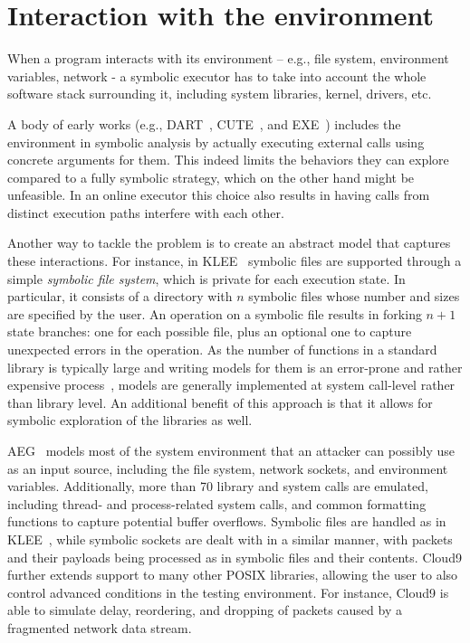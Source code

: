 
\section{Interaction with the environment}

When a program interacts with its environment -- e.g., file system, environment variables, network - a symbolic executor has to take into account the whole software stack surrounding it, including system libraries, kernel, drivers, etc.

A body of early works (e.g., {\sc DART}~\cite{DART-PLDI05}, {\sc CUTE}~\cite{CUTE-FSE13}, and {\sc EXE}~\cite{EXE-CCS06}) includes the environment in symbolic analysis by actually executing external calls using concrete arguments for them. This indeed limits the behaviors they can explore compared to a fully symbolic strategy, which on the other hand might be unfeasible. In an online executor this choice also results in having calls from distinct execution paths interfere with each other. 

Another way to tackle the problem is to create an abstract model that captures these interactions. For instance, in {\sc KLEE}~\cite{KLEE-OSDI08} symbolic files are supported through a simple {\em symbolic file system}, which is private for each execution state. In particular, it consists of a directory with $n$ symbolic files whose number and sizes are specified by the user. An operation on a symbolic file results in forking $n+1$ state branches: one for each possible file, plus an optional one to capture unexpected errors in the operation. As the number of functions in a standard library is typically large and writing models for them is an error-prone and rather expensive process~\cite{Ball06}, models are generally implemented at system call-level rather than library level. An additional benefit of this approach is that it allows for symbolic exploration of the libraries as well.

{\sc AEG}~\cite{AEG-NDSS11} models most of the system environment that an attacker can possibly use as an input source, including the file system, network sockets, and environment variables. Additionally, more than 70 library and system calls are emulated, including thread- and process-related system calls, and common formatting functions to capture potential buffer overflows. Symbolic files are handled as in {\sc KLEE}~\cite{KLEE-OSDI08}, while symbolic sockets are dealt with in a similar manner, with packets and their payloads being processed as in symbolic files and their contents. {\sc Cloud9} further extends support to many other POSIX libraries, allowing the user to also control advanced conditions in the testing environment. For instance,  {\sc Cloud9} is able to simulate delay, reordering, and dropping of packets caused by a fragmented network data stream.

